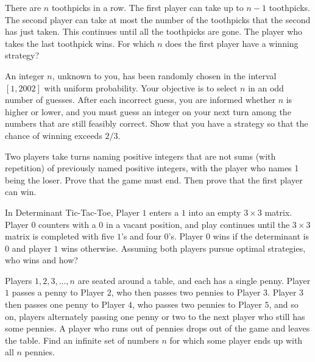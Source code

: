 \documentclass{article}
\begin{document}
\begin{exercise}
There are $n$ toothpicks in a row. The first player can take up to $n-1$ toothpicks. The second player can take at most the number of the toothpicks that the second has just taken. This continues until all the toothpicks are gone. The player who takes the last toothpick wins. For which $n$ does the first player have a winning strategy?
\end{exercise}

\begin{exercise}
An integer $n$, unknown to you, has been randomly chosen in the interval $[1,2002]$ with uniform probability. Your objective is to select $n$ in an odd number of guesses. After each incorrect guess, you are informed whether $n$ is higher or lower, and you must guess an integer on your next turn among the numbers that are still feasibly correct. Show that you have a strategy so that the chance of winning exceeds $2/3$.
\end{exercise}

\begin{exercise}
Two players take turns naming positive integers that are not sums (with repetition) of previously named positive integers, with the player who names 1 being the loser. Prove that the game must end. Then prove that the first player can win.
\end{exercise}

\begin{exercise}
In Determinant Tic-Tac-Toe, Player $1$ enters a $1$ into an empty $3\times 3$ matrix. Player $0$ counters with a $0$ in a vacant position, and play continues until the $3\times 3$ matrix is completed with five $1$'s and four $0$'s. Player $0$ wins if the determinant is $0$ and player $1$ wins otherwise. Assuming both players pursue optimal strategies, who wins and how?
\end{exercise}

\begin{exercise}[1997 A2]
Players $1,2,3,\dots,n$ are seated around a table, and each has a single penny. Player $1$ passes a penny to Player $2$, who then passes two pennies to Player $3$. Player $3$ then passes one penny to Player $4$, who passes two pennies to Player $5$, and so on, players alternately passing one penny or two to the next player who still has some pennies. A player who runs out of pennies drops out of the game and leaves the table. Find an infinite set of numbers $n$ for which some player ends up with all $n$ pennies.
\end{exercise}
\end{document}
